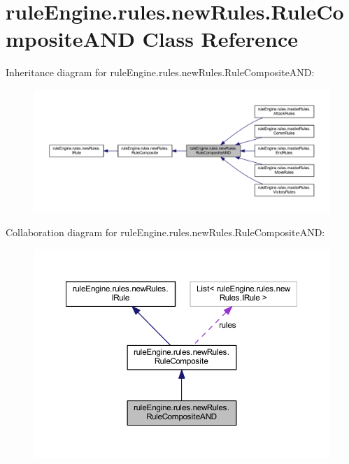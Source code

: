 \hypertarget{classrule_engine_1_1rules_1_1new_rules_1_1_rule_composite_a_n_d}{}\section{rule\+Engine.\+rules.\+new\+Rules.\+Rule\+Composite\+A\+ND Class Reference}
\label{classrule_engine_1_1rules_1_1new_rules_1_1_rule_composite_a_n_d}


Inheritance diagram for rule\+Engine.\+rules.\+new\+Rules.\+Rule\+Composite\+A\+ND\+:
\nopagebreak
\begin{figure}[H]
\begin{center}
\leavevmode
\includegraphics[width=350pt]{classrule_engine_1_1rules_1_1new_rules_1_1_rule_composite_a_n_d__inherit__graph}
\end{center}
\end{figure}


Collaboration diagram for rule\+Engine.\+rules.\+new\+Rules.\+Rule\+Composite\+A\+ND\+:
\nopagebreak
\begin{figure}[H]
\begin{center}
\leavevmode
\includegraphics[width=350pt]{classrule_engine_1_1rules_1_1new_rules_1_1_rule_composite_a_n_d__coll__graph}
\end{center}
\end{figure}
